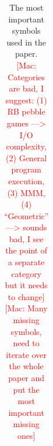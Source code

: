 \documentclass[sigplan,review,anonymous]{acmart}\settopmatter{printfolios=true,printccs=false,printacmref=false}
\newcommand\mac[1]{\textcolor{red}{[Mac: #1]}}
\begin{document}
\begin{table}[h!]
\begin{tabular}{@{}l|ll@{}}
 	\bottomrule
 \end{tabular}
%
%
  \caption{The most important symbols used in the paper. \mac{Categories are
  bad, I suggest: (1) RB pebble games ---> I/O complexity, (2) General program
  execution, (3) MMM, (4) ``Geometric'' ---> sounds bad, I see the point of a
  separate category but it needs to change} \mac{Many missing symbols, need to
  iterate over the whole paper and put the most important missing ones}}
%
  \label{tab:symbols}
  \vspace{-0.5em}
\end{table}
%
%
%
\end{document}
